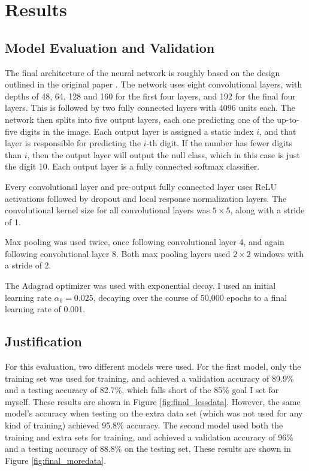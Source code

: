 \documentclass[12pt]{article}
\begin{document}
\section{Results}
\subsection{Model Evaluation and Validation} \label{sssec:evaluation}
The final architecture of the neural network is roughly based on the design outlined in the original paper \cite{svhn_original_paper}.
The network uses eight convolutional layers, with depths of 48, 64, 128 and 160 for the first four layers, and 192 for the final four layers.
This is followed by two fully connected layers with 4096 units each.
The network then splits into five output layers, each one predicting one of the up-to-five digits in the image. 
Each output layer is assigned a static index $i$, and that layer is responsible for predicting the $i$-th digit. 
If the number has fewer digits than $i$, then the output layer will output the null class, which in this case is just the digit 10.
Each output layer is a fully connected softmax classifier.

Every convolutional layer and pre-output fully connected layer uses ReLU\cite{relu} activations followed by dropout\cite{svhn_dropout} and local response normalization\cite{svhn_lrn} layers.
The convolutional kernel size for all convolutional layers was $5 \times 5$, along with a stride of 1.

Max pooling was used twice, once following convolutional layer 4, and again following convolutional layer 8.
Both max pooling layers used $2 \times 2$ windows with a stride of 2.

The Adagrad optimizer was used with exponential decay. I used an initial learning rate $\alpha_0 = 0.025$, decaying over the course of 50,000 epochs to a final learning rate of 0.001.

\subsection{Justification} \label{sssec:justification}
For this evaluation, two different models were used.
For the first model, only the training set was used for training, and achieved a validation accuracy of 89.9\% and a testing accuracy of 82.7\%, which falls short of the 85\% goal I set for myself.
These results are shown in Figure \ref{fig:final_lessdata}.
However, the same model's accuracy when testing on the extra data set (which was not used for any kind of training) achieved 95.8\% accuracy.
The second model used both the training and extra sets for training, and achieved a validation accuracy of 96\% and a testing accuracy of 88.8\% on the testing set.
These results are shown in Figure \ref{fig:final_moredata}.
\end{document}
